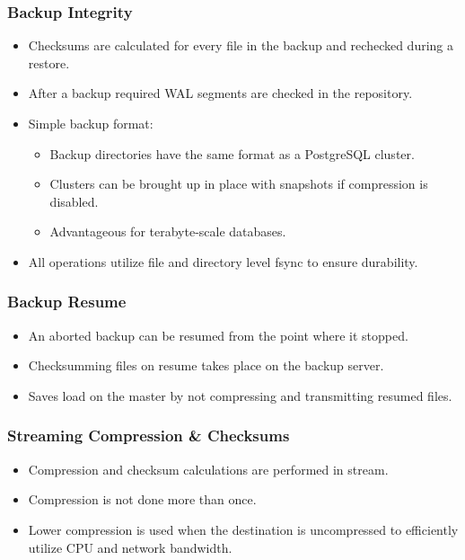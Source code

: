 \begin{frame}
    \frametitle{Backup Integrity}

    \begin{itemize}
        \item Checksums are calculated for every file in the backup and rechecked during a restore.\pause
        \item After a backup required WAL segments are checked in the repository.\pause
        \item Simple backup format:\pause

            \begin{itemize}
                \item Backup directories have the same format as a PostgreSQL cluster.\pause
                \item Clusters can be brought up in place with snapshots if compression is disabled.\pause
                \item Advantageous for terabyte-scale databases.\pause
            \end{itemize}

        \item All operations utilize file and directory level fsync to ensure durability.
    \end{itemize}
\end{frame}

\begin{frame}
    \frametitle{Backup Resume}

    \begin{itemize}
        \item An aborted backup can be resumed from the point where it stopped.\pause
        \item Checksumming files on resume takes place on the backup server.\pause
        \item Saves load on the master by not compressing and transmitting resumed files.
    \end{itemize}
\end{frame}

\begin{frame}
    \frametitle{Streaming Compression \& Checksums}

    \begin{itemize}
        \item Compression and checksum calculations are performed in stream.\pause
        \item Compression is not done more than once.\pause
        \item Lower compression is used when the destination is uncompressed to efficiently utilize CPU and network bandwidth.
    \end{itemize}
\end{frame}


